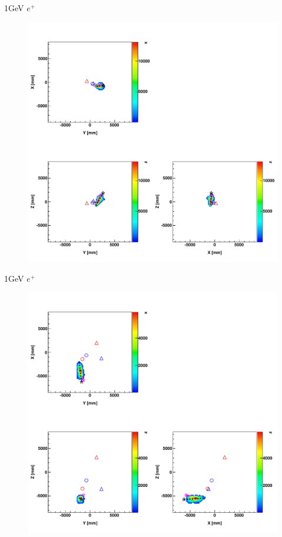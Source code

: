 \documentclass{beamer} %
\begin{document}
\begin{frame}{1GeV $e^+$}
	\begin{figure}
		\includegraphics[width=\textwidth,height=0.9\textheight,keepaspectratio]
			{material/fom_map_e+_mtq_run0_evt472.pdf}
	\end{figure}
\end{frame}

\begin{frame}{1GeV $e^+$}
	\begin{figure}
		\includegraphics[width=\textwidth,height=0.9\textheight,keepaspectratio]
			{material/fom_map_e+_mtq_run0_evt566.pdf}
	\end{figure}
\end{frame}
\end{document}
